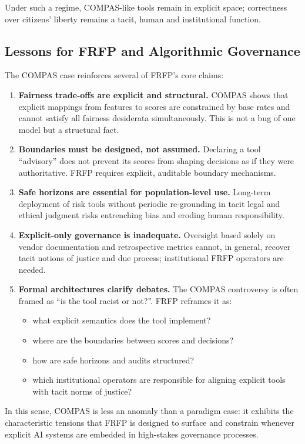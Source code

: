 Under such a regime, COMPAS-like tools remain in explicit space; correctness
over citizens’ liberty remains a tacit, human and institutional function.

\subsection{Lessons for FRFP and Algorithmic Governance}

The COMPAS case reinforces several of FRFP’s core claims:

\begin{enumerate}
  \item \textbf{Fairness trade-offs are explicit and structural.}
        COMPAS shows that explicit mappings from features to scores are
        constrained by base rates and cannot satisfy all fairness desiderata
        simultaneously.
        This is not a bug of one model but a structural fact.

  \item \textbf{Boundaries must be designed, not assumed.}
        Declaring a tool ``advisory'' does not prevent its scores from
        shaping decisions as if they were authoritative.
        FRFP requires explicit, auditable boundary mechanisms.

  \item \textbf{Safe horizons are essential for population-level use.}
        Long-term deployment of risk tools without periodic re-grounding in
        tacit legal and ethical judgment risks entrenching bias and eroding
        human responsibility.

  \item \textbf{Explicit-only governance is inadequate.}
        Oversight based solely on vendor documentation and retrospective
        metrics cannot, in general, recover tacit notions of justice and due
        process; institutional FRFP operators are needed.

  \item \textbf{Formal architectures clarify debates.}
        The COMPAS controversy is often framed as ``is the tool racist or
        not?''.
        FRFP reframes it as:
        \begin{itemize}
          \item what explicit semantics does the tool implement?
          \item where are the boundaries between scores and decisions?
          \item how are safe horizons and audits structured?
          \item which institutional operators are responsible for aligning
                explicit tools with tacit norms of justice?
        \end{itemize}
\end{enumerate}

In this sense, COMPAS is less an anomaly than a paradigm case: it exhibits
the characteristic tensions that FRFP is designed to surface and constrain
whenever explicit AI systems are embedded in high-stakes governance
processes.

